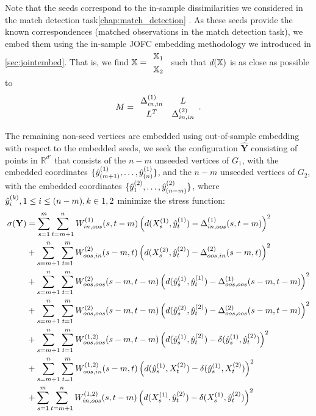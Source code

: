 \documentclass[12pt,oneside,final]{thesis}
\begin{document}
Note that the seeds correspond to the in-sample dissimilarities we considered in the match detection task\ref{chap:match_detection} . As these seeds provide the known correspondences (matched observations in the match detection task), we embed them using the in-sample JOFC embedding methodology we introduced in \ref{sec:jointembed}. That is, we find $\X= \begin{array}{c}
\X_1 \\
\X_2
\end{array}$ such that $d(\mathbb{X})$ is as close as possible to $$M= \begin{array}{cc}
\gD^{(1)}_{in,in} & L \\
 L^T &\gD^{(2)}_{in,in}
\end{array} . $$

The remaining non-seed vertices are embedded using out-of-sample embedding with respect to the embedded seeds, \ie we seek the configuration ${ \hat{\mathbf{Y}}}$ consisting of points in $\mathbb{R}^{d'}$ that consists of the $n-m$ unseeded vertices of $G_1$, with the embedded coordinates  $\{\hat{y}^{(1)}_{(m+1)},\ldots,\hat{y}^{(1)}_{(n)}\}$, and the $n-m$ unseeded vertices of $G_2$, with the embedded coordinates  $\{\hat{y}^{(2)}_1,\ldots,\hat{y}^{(2)}_{(n-m)}\}$, where $\yhat_{i}^{(k)}, \onespace 1\leq i \leq (n-m), k \in {1,2}$  minimize the stress function:
\begin{align}
\sigma({\bf Y})&=\sum_{s=1}^{m}\sum_{t=m+1}^{n} {W^{(1)}_{in,oos}(s,t-m)  \left(d(X^{(1)}_{s},\hat{y}_t^{(1)})-{\Delta}^{(1)}_{in,oos}(s,t-m)\right)^2 } \label{eq:oos}\\
&+\sum_{s=m+1}^{n}\sum_{t=1}^{m}
{W^{(2)}_{oos,in}(s-m,t)  \left(d(X^{(2)}_{s},\hat{y}_t^{(2)})-{\Delta}^{(2)}_{oos,in}(s-m,t)\right)^2}  \label{eq:oos2}\\
&+\sum_{s=m+1}^{n}\sum_{t=1}^{m} 
{W^{(2)}_{oos,oos}(s-m,t-m) \left(d(\hat{y}_s^{(1)},\hat{y}_t^{(1)})-{\Delta}^{(1)}_{oos,oos}(s-m,t-m)\right)^2} \label{eq:oos3}\\
&+\sum_{s=m+1}^{n}\sum_{t=1}^{m} 
{W^{(2)}_{oos,oos}(s-m,t-m) \left(d(\hat{y}_s^{(2)},\hat{y}_t^{(2)})-{\Delta}^{(2)}_{oos,oos}(s-m,t-m)\right)^2} \label{eq:oos4} \\
&+\sum_{s=m+1}^{n} \sum_{t=1}^{m}
W^{(1,2)}_{oos,oos}(s-m,t-m) \left(d(\hat{y}_s^{(1)},\hat{y}_t^{(2)})-\delta(\hat{y}_s^{(1)},\hat{y}_t^{(2)})\right)^2 \label{eq:oos5}\\
&+\sum_{s=m+1}^{n} \sum_{t=1}^{m}
W^{(1,2)}_{oos,in}(s-m,t) \left(d(\hat{y}_s^{(1)},X^{(2)}_{t})-\delta(\hat{y}_s^{(1)},X^{(2)}_{t})\right)^2 \label{eq:oos6}\\
&+\sum_{s=1}^{m} \sum_{t=m+1}^{n}
W^{(1,2)}_{in,oos}(s,t-m) \left(d(X^{(1)}_{s},\hat{y}_t^{(2)})-\delta(X^{(1)}_{s},\hat{y}_t^{(2)})\right)^2 \label{eq:oos7}
\end{align}
\end{document}
